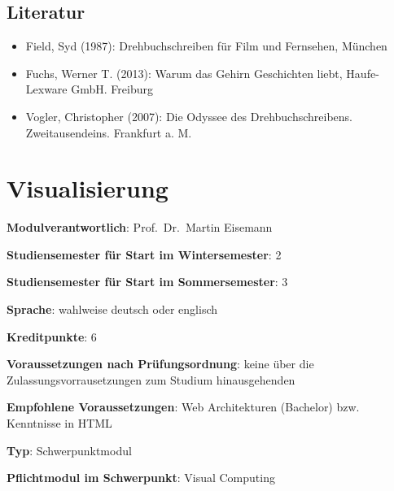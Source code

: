 \section*{Literatur\label{/mi-2017/modulbeschreibungen-master/MA_VC_Modul_Storytelling}}\label{literaturpathlabelmi-2017modulbeschreibungen-mastermaux5fvcux5fmodulux5fstorytelling}

\begin{itemize}
\tightlist
\item
  Field, Syd (1987): Drehbuchschreiben für Film und Fernsehen, München
\item
  Fuchs, Werner T. (2013): Warum das Gehirn Geschichten liebt,
  Haufe-Lexware GmbH. Freiburg
\item
  Vogler, Christopher (2007): Die Odyssee des Drehbuchschreibens.
  Zweitausendeins. Frankfurt a. M.
\end{itemize}

\chapter{Visualisierung\label{/mi-2017/modulbeschreibungen-master/MA_VC_Modul_Visualisierung}}\label{visualisierungpathlabelmi-2017modulbeschreibungen-mastermaux5fvcux5fmodulux5fvisualisierung}

\begin{modulHead}
\textbf{Modulverantwortlich}: Prof.~Dr.~Martin
Eisemann
\end{modulHead}
\begin{modulHead}
\textbf{Studiensemester für
Start im Wintersemester}:
2
\end{modulHead}
\begin{modulHead}
\textbf{Studiensemester für Start
im Sommersemester}:
3
\end{modulHead}
\begin{modulHead}
\textbf{Sprache}: wahlweise deutsch
oder englisch
\end{modulHead}
\begin{modulHead}
\textbf{Kreditpunkte}:
6
\end{modulHead}
\begin{modulHead}
\textbf{Voraussetzungen nach
Prüfungsordnung}: keine über die Zulassungsvorrausetzungen zum Studium
hinausgehenden
\end{modulHead}
\begin{modulHead}
\textbf{Empfohlene
Voraussetzungen}: Web Architekturen (Bachelor) bzw. Kenntnisse in
HTML
\end{modulHead}
\begin{modulHead}
\textbf{Typ}:
Schwerpunktmodul
\end{modulHead}
\begin{modulHead}
\textbf{Pflichtmodul
im Schwerpunkt}: Visual Computing
\end{modulHead}


